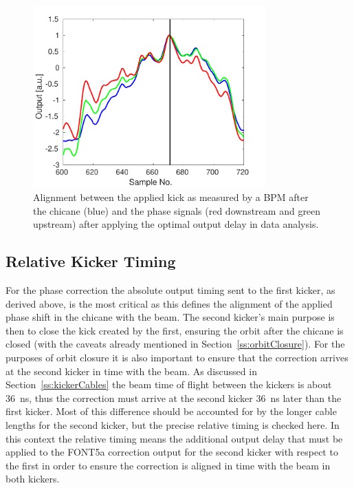 \begin{figure}
  \centering
  \includegraphics[width=0.8\textwidth]{Figures/commissioning/absTimBeam_opt}
  \caption{Alignment between the applied kick as measured by a BPM after the chicane (blue) and the phase signals (red downstream and green upstream) after applying the optimal output delay in data analysis.}
  \label{f:absTimBeam_opt}
\end{figure}


\subsection{Relative Kicker Timing}
\label{ss:relativeTiming}

For the phase correction the absolute output timing sent to the first kicker, as derived above, is the most critical as this defines the alignment of the applied phase shift in the chicane with the beam. The second kicker's main purpose is then to close the kick created by the first, ensuring the orbit after the chicane is closed (with the caveats already mentioned in Section~\ref{ss:orbitClosure}). For the purposes of orbit closure it is also important to ensure that the correction arrives at the second kicker in time with the beam. As discussed in Section~\ref{ss:kickerCables} the beam time of flight between the kickers is about 36~ns, thus the correction must arrive at the second kicker 36~ns later than the first kicker. Most of this difference should be accounted for by the longer cable lengths for the second kicker, but the precise relative timing is checked here. In this context the relative timing means the additional output delay that must be applied to the FONT5a correction output for the second kicker with respect to the first in order to ensure the correction is aligned in time with the beam in both kickers.

